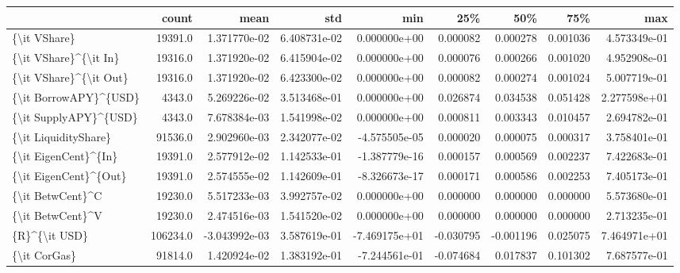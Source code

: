 \begin{tabular}{lrrrrrrrr}
\toprule
{} &     count &          mean &           std &           min &       25\% &       50\% &       75\% &           max \\
\midrule
\{\textbackslash it VShare\}             &   19391.0 &  1.371770e-02 &  6.408731e-02 &  0.000000e+00 &  0.000082 &  0.000278 &  0.001036 &  4.573349e-01 \\
\{\textbackslash it VShare\}\textasciicircum \{\textbackslash it In\}    &   19316.0 &  1.371920e-02 &  6.415904e-02 &  0.000000e+00 &  0.000076 &  0.000266 &  0.001020 &  4.952908e-01 \\
\{\textbackslash it VShare\}\textasciicircum \{\textbackslash it Out\}   &   19316.0 &  1.371920e-02 &  6.423300e-02 &  0.000000e+00 &  0.000082 &  0.000274 &  0.001024 &  5.007719e-01 \\
\{\textbackslash it BorrowAPY\}\textasciicircum \{USD\}    &    4343.0 &  5.269226e-02 &  3.513468e-01 &  0.000000e+00 &  0.026874 &  0.034538 &  0.051428 &  2.277598e+01 \\
\{\textbackslash it SupplyAPY\}\textasciicircum \{USD\}    &    4343.0 &  7.678384e-03 &  1.541998e-02 &  0.000000e+00 &  0.000811 &  0.003343 &  0.010457 &  2.694782e-01 \\
\{\textbackslash it LiquidityShare\}     &   91536.0 &  2.902960e-03 &  2.342077e-02 & -4.575505e-05 &  0.000020 &  0.000075 &  0.000317 &  3.758401e-01 \\
\{\textbackslash it EigenCent\}\textasciicircum \{In\}     &   19391.0 &  2.577912e-02 &  1.142533e-01 & -1.387779e-16 &  0.000157 &  0.000569 &  0.002237 &  7.422683e-01 \\
\{\textbackslash it EigenCent\}\textasciicircum \{Out\}    &   19391.0 &  2.574555e-02 &  1.142609e-01 & -8.326673e-17 &  0.000171 &  0.000586 &  0.002253 &  7.405173e-01 \\
\{\textbackslash it BetwCent\}\textasciicircum C         &   19230.0 &  5.517233e-03 &  3.992757e-02 &  0.000000e+00 &  0.000000 &  0.000000 &  0.000000 &  5.573680e-01 \\
\{\textbackslash it BetwCent\}\textasciicircum V         &   19230.0 &  2.474516e-03 &  1.541520e-02 &  0.000000e+00 &  0.000000 &  0.000000 &  0.000000 &  2.713235e-01 \\
\{R\}\textasciicircum \{\textbackslash it USD\}            &  106234.0 & -3.043992e-03 &  3.587619e-01 & -7.469175e+01 & -0.030795 & -0.001196 &  0.025075 &  7.464971e+01 \\
\{\textbackslash it CorGas\}             &   91814.0 &  1.420924e-02 &  1.383192e-01 & -7.244561e-01 & -0.074684 &  0.017837 &  0.101302 &  7.687577e-01 \\

\end{tabular}
